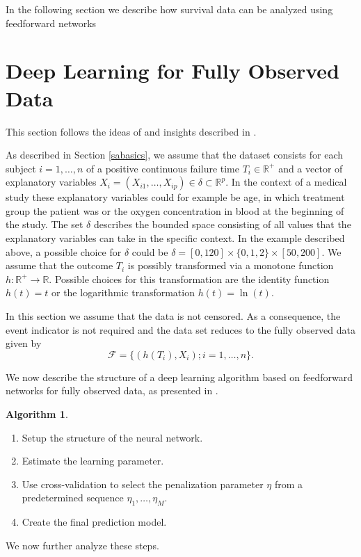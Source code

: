 \documentclass[12pt, a4paper]{scrartcl}
\theoremstyle{definition}
\newtheorem{Algorithm}{Algorithm}[section]
\theoremstyle{plain}
\numberwithin{equation}{section}
\numberwithin{figure}{section}
\numberwithin{table}{section}
\begin{document}
	In the following section we describe how survival data can be analyzed using feedforward networks
	
	\newpage
	
	\section{Deep Learning for Fully Observed Data} \label{uncensored}
	This section follows the ideas of \citet*{basearticle} and insights described in \citet*{deeplbook}.
	
	As described in Section \ref{sabasics}, we assume that the dataset consists for each subject $i = 1,\dots,n$ of a positive continuous failure time $T_i \in \mathbb{R}^+$ and a vector of explanatory variables $X_i = (X_{i1}, \dots , X_{ip}) \in \delta \subset \mathbb{R}^p$.
	In the context of a medical study these explanatory variables could for example be age, in which treatment group the patient was or the oxygen concentration in blood at the beginning of the study.
	The set $\delta$ describes the bounded space consisting of all values that the explanatory variables can take in the specific context.
	In the example described above, a possible choice for $\delta$ could be $\delta = [0, 120] \times \{0,1,2\} \times [50, 200]$.
	We assume that the outcome $T_i$ is possibly transformed via a monotone function $h: \mathbb{R}^+ \rightarrow \mathbb{R}$.
	Possible choices for this transformation are the identity function $h(t)=t$ or the logarithmic transformation $h(t)= \ln (t)$.
	
	In this section we assume that the data is not censored.
	As a consequence, the event indicator is not required and the data set reduces to the fully observed data given by
	\begin{equation*}
	\mathcal{F} =\{ \left( h(T_i), X_i\right); i = 1, \dots, n\}.
	\end{equation*}
	
	We now describe the structure of a deep learning algorithm based on feedforward networks for fully observed data, as presented in \citet*{basearticle}.
	
	\begin{Algorithm}\label{alg:nocensor}
		~
	\begin{enumerate}
		\item Setup the structure of the neural network.
		\item Estimate the learning parameter.
		\item Use cross-validation to select the penalization parameter $\eta$ from a predetermined sequence $\eta_1,\dots,\eta_M$.
		\item Create the final prediction model.
	\end{enumerate}
	\end{Algorithm}
	\noindent We now further analyze these steps.
	
\end{document}

